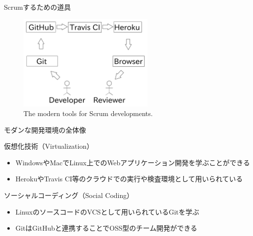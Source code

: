 \documentclass[t, aspectratio=169]{beamer}
\begin{document}
\begin{frame}[label=sec-1-4-3]{Scrumするための道具}
\begin{figure}[htb]
\centering
\includegraphics[width=0.6\textwidth]{./figures/tools.pdf}
\caption{\label{tools}The modern tools for Scrum developments.}
\end{figure}
\end{frame}
\begin{frame}[label=sec-1-4-4]{モダンな開発環境の全体像}
\begin{block}{仮想化技術（Virtualization）}
\begin{itemize}
\item WindowsやMacでLinux上でのWebアプリケーション開発を学ぶことができる
\item HerokuやTravis CI等のクラウドでの実行や検査環境として用いられている
\end{itemize}
\end{block}

\begin{block}{ソーシャルコーディング（Social Coding）}
\begin{itemize}
\item LinuxのソースコードのVCSとして用いられているGitを学ぶ
\item GitはGitHubと連携することでOSS型のチーム開発ができる
\end{itemize}
\end{block}
\end{frame}
\end{document}
